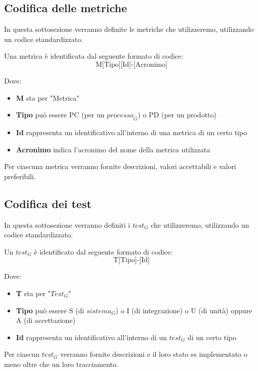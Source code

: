 \subsection{Codifica delle metriche}
In questa sottosezione verranno definite le metriche che utilizzeremo, utilizzando un codice standardizzato.

Una metrica è identificata dal seguente formato di codice:
\[
\text{M[Tipo][Id]-[Acronimo]}
\]

Dove:
\begin{itemize}
    \item \textbf{M} sta per "Metrica"
    \item \textbf{Tipo} può essere PC (per un $\textit{processo}_G$) o PD (per un prodotto)
    \item \textbf{Id} rappresenta un identificativo all'interno di una metrica di un certo tipo
    \item \textbf{Acronimo} indica l'acronimo del nome della metrica utilizzata
\end{itemize}

Per ciascuna metrica verranno fornite descrizioni, valori accettabili e valori preferibili.
\subsection{Codifica dei test}
In questa sottosezione verranno definiti i $\textit{test}_G$ che utilizzeremo, utilizzando un codice standardizzato.

Un $\textit{test}_G$ è identificato dal seguente formato di codice:
\[
\text{T[Tipo]-[Id]}
\]

Dove:
\begin{itemize}
    \item \textbf{T} sta per "$\textit{Test}_G$"
    \item \textbf{Tipo} può essere S (di $\textit{sistema}_G$) o I (di integrazione) o U (di unità) oppure A (di accettazione)
    \item \textbf{Id} rappresenta un identificativo all'interno di un $\textit{test}_G$ di un certo tipo
\end{itemize}

Per ciascun $\textit{test}_G$ verranno fornite descrizioni e il loro stato se implementato o meno oltre che un loro tracciamento.